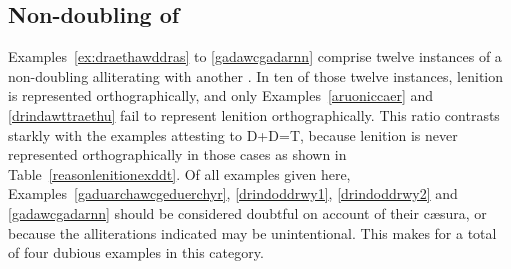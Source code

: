 \begin{mwl}
\end{mwl}


\subsection{Non-doubling of  \lT}
Examples~\ref{ex:draethawddras} to \ref{gadawcgadarnn} comprise twelve instances of a non-doubling {\lT} alliterating with another {\lT}. In ten of those twelve instances, lenition is represented orthographically, and only Examples~\ref{aruoniccaer} and \ref{drindawttraethu} fail to represent lenition orthographically. This ratio contrasts starkly with the examples attesting to \gls{D}+\gls{D}=\gls{T}, because lenition is never represented orthographically in those cases as shown in Table~\ref{reasonlenitionexddt}.
Of all examples given here, Examples~\ref{gaduarchawcgeduerchyr}, \ref{drindoddrwy1}, \ref{drindoddrwy2} and
\ref{gadawcgadarnn} should be considered doubtful on account of their cæsura, or because the alliterations indicated may be unintentional. This makes for a total of four dubious examples in this category.

